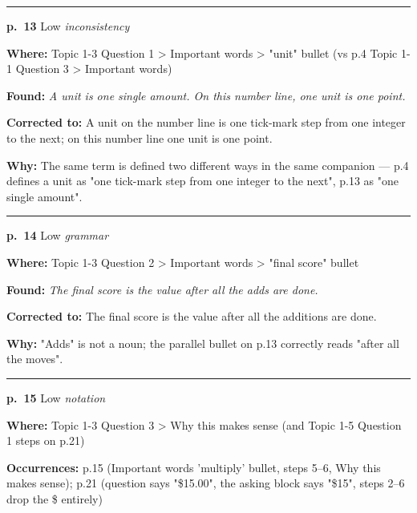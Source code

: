 \documentclass[11pt]{article}
\newcommand{\sevlow}[1]{\textcolor{black!55}{#1}}
\begin{document}
\noindent\rule{\textwidth}{0.4pt}\par\nobreak\vspace{2pt}
\noindent\textbf{p.~13} \quad \sevlow{Low} \quad \textit{inconsistency}\par
\noindent\textbf{Where: }Topic 1-3 Question 1 > Important words > "unit" bullet (vs p.4 Topic 1-1 Question 3 > Important words)\par
\noindent\textbf{Found: }\textit{A unit is one single amount. On this number line, one unit is one point.}\par
\noindent\textbf{Corrected to: }A unit on the number line is one tick-mark step from one integer to the next; on this number line one unit is one point.\par
\noindent\textbf{Why: }The same term is defined two different ways in the same companion --- p.4 defines a unit as "one tick-mark step from one integer to the next", p.13 as "one single amount".\par\vspace{4pt}
\noindent\rule{\textwidth}{0.4pt}\par\nobreak\vspace{2pt}
\noindent\textbf{p.~14} \quad \sevlow{Low} \quad \textit{grammar}\par
\noindent\textbf{Where: }Topic 1-3 Question 2 > Important words > "final score" bullet\par
\noindent\textbf{Found: }\textit{The final score is the value after all the adds are done.}\par
\noindent\textbf{Corrected to: }The final score is the value after all the additions are done.\par
\noindent\textbf{Why: }"Adds" is not a noun; the parallel bullet on p.13 correctly reads "after all the moves".\par\vspace{4pt}
\noindent\rule{\textwidth}{0.4pt}\par\nobreak\vspace{2pt}
\noindent\textbf{p.~15} \quad \sevlow{Low} \quad \textit{notation}\par
\noindent\textbf{Where: }Topic 1-3 Question 3 > Why this makes sense (and Topic 1-5 Question 1 steps on p.21)\par
\noindent\textbf{Occurrences: }p.15 (Important words 'multiply' bullet, steps 5--6, Why this makes sense); p.21 (question says "\$15.00", the asking block says "\$15", steps 2--6 drop the \$ entirely)\par
\end{document}
